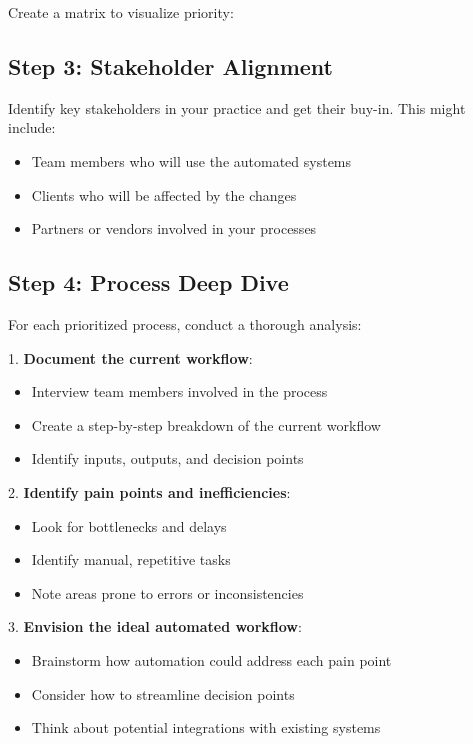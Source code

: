 Create a matrix to visualize priority:


\subsection{Step 3: Stakeholder Alignment}

Identify key stakeholders in your practice and get their buy-in. This might include:
\begin{itemize}
    \item Team members who will use the automated systems
    \item Clients who will be affected by the changes
    \item Partners or vendors involved in your processes
\end{itemize}

\subsection{Step 4: Process Deep Dive}

For each prioritized process, conduct a thorough analysis:

1. \textbf{Document the current workflow}:
   \begin{itemize}
     \item Interview team members involved in the process
     \item Create a step-by-step breakdown of the current workflow
     \item Identify inputs, outputs, and decision points
   \end{itemize}

2. \textbf{Identify pain points and inefficiencies}:
   \begin{itemize}
     \item Look for bottlenecks and delays
     \item Identify manual, repetitive tasks
     \item Note areas prone to errors or inconsistencies
   \end{itemize}

3. \textbf{Envision the ideal automated workflow}:
   \begin{itemize}
     \item Brainstorm how automation could address each pain point
     \item Consider how to streamline decision points
     \item Think about potential integrations with existing systems
   \end{itemize}

